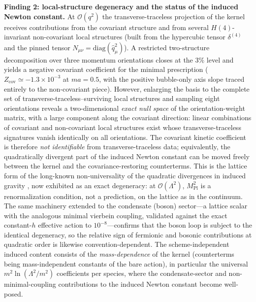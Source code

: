 \documentclass[11pt,a4paper]{article}
\begin{document}
\textbf{Finding 2: local-structure degeneracy and the status of
the induced Newton constant.}
At $\mathcal{O}(q^2)$ the transverse-traceless projection of the
kernel receives contributions from the covariant structure and
from several $H(4)$-invariant non-covariant local structures
(built from the hypercubic tensor $\delta^{(4)}$ and the pinned
tensor $N_{\mu\nu} = \mathrm{diag}(\hat{q}_\mu^2)$).
A restricted two-structure decomposition over three momentum
orientations closes at the $3\%$ level and yields a negative
covariant coefficient for the minimal prescription
($Z_{\mathrm{cov}} \simeq -1.3\times10^{-3}$ at $ma = 0.5$, with
the positive bubble-only axis slope traced entirely to the
non-covariant piece).
However, enlarging the basis to the complete set of
transverse-traceless--surviving local structures and sampling
eight orientations reveals a two-dimensional \emph{exact null
space} of the orientation-weight matrix, with a large component
along the covariant direction: linear combinations of covariant
and non-covariant local structures exist whose transverse-traceless
signatures vanish identically on all orientations.
The covariant kinetic coefficient is therefore \emph{not
identifiable} from transverse-traceless data; equivalently, the
quadratically divergent part of the induced Newton constant can be
moved freely between the kernel and the covariance-restoring
counterterms.
This is the lattice form of the long-known non-universality of the
quadratic divergences in induced gravity \cite{Visser:2002ew}, now
exhibited as an exact degeneracy: at $\mathcal{O}(\Lambda^2)$,
$M_{\mathrm{Pl}}^2$ is a renormalization condition, not a
prediction, on the lattice as in the continuum.
The same machinery extended to the condensate (boson) sector---a
lattice scalar with the analogous minimal vierbein coupling,
validated against the exact constant-$h$ effective action to
$10^{-8}$---confirms that the boson loop is subject to the
identical degeneracy, so the relative sign of fermionic and
bosonic contributions at quadratic order is likewise
convention-dependent.
The scheme-independent induced content consists of the
\emph{mass-dependence} of the kernel (counterterms being
mass-independent constants of the bare action), in particular the
universal $m^2\ln(\Lambda^2/m^2)$ coefficients per species, where
the condensate-sector and non-minimal-coupling contributions to
the induced Newton constant become well-posed.
\end{document}
